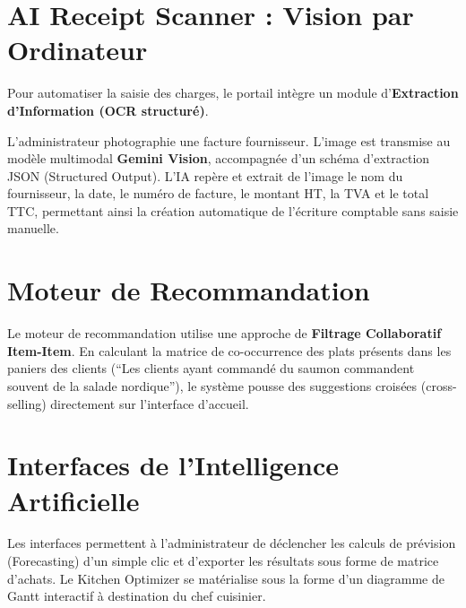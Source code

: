 \section{AI Receipt Scanner : Vision par Ordinateur}

Pour automatiser la saisie des charges, le portail intègre un module d'\textbf{Extraction d'Information (OCR structuré)}.

L'administrateur photographie une facture fournisseur. L'image est transmise au modèle multimodal \textbf{Gemini Vision}, accompagnée d'un schéma d'extraction JSON (Structured Output). L'IA repère et extrait de l'image le nom du fournisseur, la date, le numéro de facture, le montant HT, la TVA et le total TTC, permettant ainsi la création automatique de l'écriture comptable sans saisie manuelle.

\section{Moteur de Recommandation}

Le moteur de recommandation utilise une approche de \textbf{Filtrage Collaboratif Item-Item}. En calculant la matrice de co-occurrence des plats présents dans les paniers des clients (``Les clients ayant commandé du saumon commandent souvent de la salade nordique''), le système pousse des suggestions croisées (cross-selling) directement sur l'interface d'accueil.

\section{Interfaces de l'Intelligence Artificielle}


Les interfaces permettent à l'administrateur de déclencher les calculs de prévision (Forecasting) d'un simple clic et d'exporter les résultats sous forme de matrice d'achats. Le Kitchen Optimizer se matérialise sous la forme d'un diagramme de Gantt interactif à destination du chef cuisinier.

